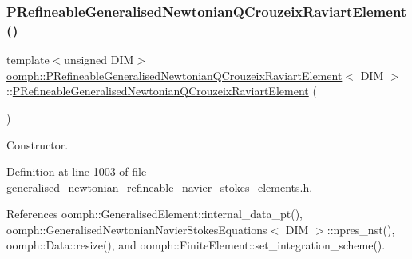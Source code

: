 \subsubsection{\texorpdfstring{P\+Refineable\+Generalised\+Newtonian\+Q\+Crouzeix\+Raviart\+Element()}{PRefineableGeneralisedNewtonianQCrouzeixRaviartElement()}\hspace{0.1cm}{\footnotesize\ttfamily [1/2]}}
{\footnotesize\ttfamily template$<$unsigned D\+IM$>$ \\
\hyperlink{classoomph_1_1PRefineableGeneralisedNewtonianQCrouzeixRaviartElement}{oomph\+::\+P\+Refineable\+Generalised\+Newtonian\+Q\+Crouzeix\+Raviart\+Element}$<$ D\+IM $>$\+::\hyperlink{classoomph_1_1PRefineableGeneralisedNewtonianQCrouzeixRaviartElement}{P\+Refineable\+Generalised\+Newtonian\+Q\+Crouzeix\+Raviart\+Element} (\begin{DoxyParamCaption}{ }\end{DoxyParamCaption})\hspace{0.3cm}{\ttfamily [inline]}}



Constructor. 



Definition at line 1003 of file generalised\+\_\+newtonian\+\_\+refineable\+\_\+navier\+\_\+stokes\+\_\+elements.\+h.



References oomph\+::\+Generalised\+Element\+::internal\+\_\+data\+\_\+pt(), oomph\+::\+Generalised\+Newtonian\+Navier\+Stokes\+Equations$<$ D\+I\+M $>$\+::npres\+\_\+nst(), oomph\+::\+Data\+::resize(), and oomph\+::\+Finite\+Element\+::set\+\_\+integration\+\_\+scheme().

\mbox{\label{classoomph_1_1PRefineableGeneralisedNewtonianQCrouzeixRaviartElement_a6a421a60c83a76fabaf44495d104a3c5}} 
